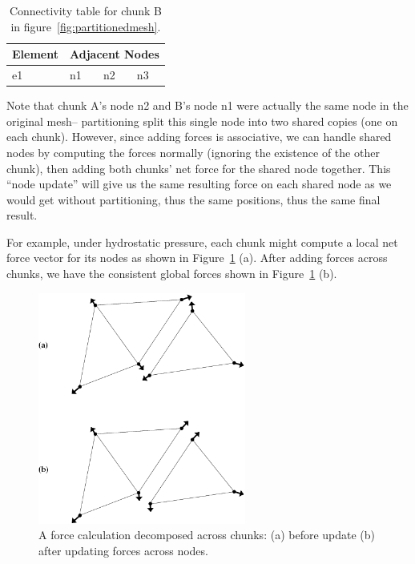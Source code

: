 \documentclass[10pt]{article}
\begin{document}
\begin{table}[hh]
\begin{center}
\begin{tabular}{||l||l|l|l||}\hline
Element & \multicolumn{3}{c||}{Adjacent Nodes}\\\hline
e1 & n1 & n2 & n3 \\
\hline
\end{tabular}
\end{center}
\caption{Connectivity table for chunk B in figure~\ref{fig:partitionedmesh}.}
\label{table:chunkB}
\end{table}

Note that chunk A's node n2 and B's node n1 were actually the same node in
the original mesh-- partitioning split this single node into two shared
copies (one on each chunk).  However, since adding forces is associative, we
can handle shared nodes by computing the forces normally (ignoring the
existence of the other chunk), then adding both chunks' net force for the
shared node together.  This ``node update'' will give us the same resulting
force on each shared node as we would get without partitioning, thus the
same positions, thus the same final result.  

For example, under hydrostatic pressure, each chunk might compute a local
net force vector for its nodes as shown in Figure~\ref{fig:forcedecomp}
(a).  After adding forces across chunks, we have the consistent global forces
shown in Figure~\ref{fig:forcedecomp} (b).

\begin{figure}[h]
\begin{center}
\includegraphics[height=3in]{fig/forcedecomp}
\end{center}
\caption{A force calculation decomposed across chunks: (a) before update
(b) after updating forces across nodes.}
\label{fig:forcedecomp}
\end{figure}
\end{document}
